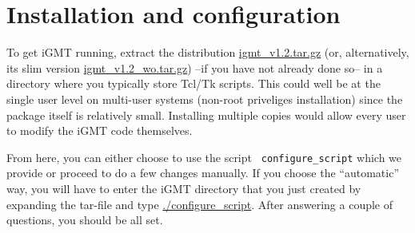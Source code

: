 \documentclass[11pt]{article}
\begin{document}
\section{Installation and configuration\label{install}}

To get iGMT running, extract the distribution \url{igmt_v1.2.tar.gz}
(or, alternatively, its slim version \url{igmt_v1.2_wo.tar.gz}) --if
you have not already done so-- in a directory where you typically
store Tcl/Tk scripts. This could well be at the single user level on
multi-user systems (non-root priveliges installation) since the
package itself is relatively small. Installing multiple copies would
allow every user to modify the iGMT code themselves.

From here, you can either choose to use the script {\tt
  configure\_script} which we provide or proceed to do a few changes
manually. If you choose the ``automatic'' way, you will have to enter
the iGMT directory that you just created by expanding the tar-file and
type \url{./configure_script}. After answering a couple of questions,
you should be all set.
\end{document}
